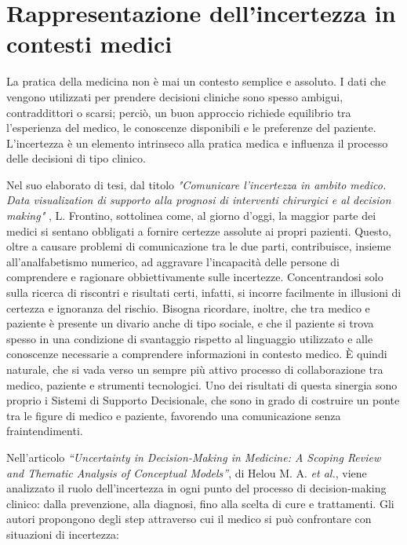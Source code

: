\section{Rappresentazione dell'incertezza in contesti medici}
\label{sec:incertezza}

La pratica della medicina non è mai un contesto semplice e assoluto. I dati che vengono utilizzati per prendere decisioni cliniche sono spesso ambigui, contraddittori o scarsi; perciò, un buon approccio richiede equilibrio tra l’esperienza del medico, le conoscenze disponibili e le preferenze del paziente.
\newline
L'incertezza è un elemento intrinseco alla pratica medica e influenza il processo delle decisioni di tipo clinico.

Nel suo elaborato di tesi, dal titolo \textit{"Comunicare l'incertezza in ambito medico. Data visualization di supporto alla prognosi di interventi chirurgici e al decision making"} \cite{tesiFrontino}, L. Frontino, sottolinea come, al giorno d’oggi, la maggior parte dei medici si sentano obbligati a fornire certezze assolute ai propri pazienti. Questo, oltre a causare problemi di comunicazione tra le due parti, contribuisce, insieme all'analfabetismo numerico, ad aggravare l’incapacità delle persone di comprendere e ragionare obbiettivamente sulle incertezze. Concentrandosi solo sulla ricerca di riscontri e risultati certi, infatti, si incorre facilmente in illusioni di certezza e ignoranza del rischio.
\newline
Bisogna ricordare, inoltre, che tra medico e paziente è presente un divario anche di tipo sociale, e che il paziente si trova spesso in una condizione di svantaggio rispetto al linguaggio utilizzato e alle conoscenze necessarie a comprendere informazioni in contesto medico.  
\newline
È quindi naturale, che si vada verso un sempre più attivo processo di collaborazione tra medico, paziente e strumenti tecnologici. Uno dei risultati di questa sinergia sono proprio i Sistemi di Supporto Decisionale, che sono in grado di costruire un ponte tra le  figure di medico e paziente, favorendo una comunicazione senza fraintendimenti.

Nell’articolo \textit{“Uncertainty in Decision-Making in Medicine: A Scoping Review and Thematic Analysis of Conceptual Models”},  di Helou M. A. \textit{et al.}, viene analizzato il ruolo dell'incertezza in ogni punto del processo di decision-making clinico: dalla prevenzione, alla diagnosi, fino alla scelta di cure e trattamenti.  Gli autori propongono degli step attraverso cui il medico si può confrontare con situazioni di incertezza:


